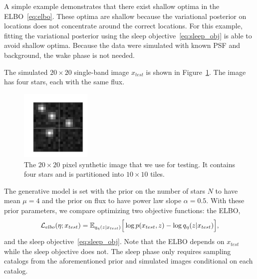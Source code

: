 

\label{sec:elbo_sleep_compare}

A simple example demonstrates that there exist shallow optima in the ELBO~\eqref{eq:elbo}. These optima are shallow because the variational posterior on locations does not concentrate around the correct locations.
For this example, fitting the variational posterior using the sleep objective~\eqref{eq:sleep_obj} is able to avoid shallow optima. 
Because the data were simulated with known PSF and background, the wake phase is not needed. 

The simulated $20\times20$ single-band image $x_{test}$ is shown in Figure~\ref{fig:toy_example}.
The image has four stars, each with the same flux. 

\begin{figure}[!h]
    \centering
    \vspace{-1em}
    \includegraphics[width = 0.3\textwidth]{figures/vi_sleep_ex_figure.png}
    \vspace{-1.7em}
    \caption{The $20\times 20$ pixel synthetic image that we use for testing. It contains four stars and is partitioned into $10\times 10$ tiles. }
    \label{fig:toy_example}
\end{figure}

The generative model is set with the prior on the number of stars $N$ to have mean $\mu = 4$ and the prior on flux to have power law slope $\alpha = 0.5$. 
With these prior parameters, we compare optimizing two objective functions: the ELBO, 
\begin{align}
\mathcal{L}_{elbo}(\eta; x_{test}) = \mathbb{E}_{q_{\eta}(z | x_{test})}\Big[\log p(x_{test}, z) - \log q_{\eta}(z | x_{test})\Big],
\label{eq:elbo_on_test}
\end{align}
and the sleep objective~\eqref{eq:sleep_obj}. 
Note that the ELBO depends on $x_{test}$ while the sleep objective does not. The sleep phase only requires sampling catalogs from the aforementioned prior and simulated images conditional on each catalog. 

